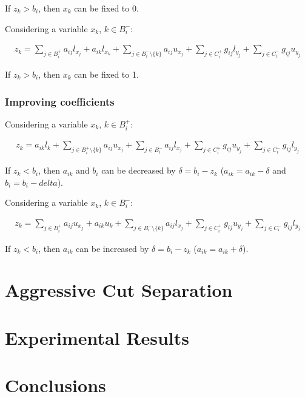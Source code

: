 \documentclass[preprint,12pt]{elsarticle}
\begin{document}
If $z_k > b_i$, then $x_k$ can be fixed to 0.

Considering a variable $x_k$, $k \in B_i^{-}$:

\begin{align}
	z_k = \sum_{j \in B_i^+}{a_{ij}l_{x_j}} + a_{ik}l_{x_k} + \sum_{j \in B_i^-\setminus\{k\}}{a_{ij}u_{x_j}} + \sum_{j \in C_i^+}{g_{ij}l_{y_j}} + \sum_{j \in C_i^-}{g_{ij}u_{y_j}}
\end{align}

If $z_k > b_i$, then $x_k$ can be fixed to 1.

\subsubsection{Improving coefficients}

Considering a variable $x_k$, $k \in B_i^{+}$:

\begin{align}
	z_k = a_{ik}l_k + \sum_{j \in B_i^+\setminus\{k\}}{a_{ij}u_{x_j}} + \sum_{j \in B_i^-}{a_{ij}l_{x_j}} + \sum_{j \in C_i^+}{g_{ij}u_{y_j}} + \sum_{j \in C_i^-}{g_{ij}l_{y_j}}
\end{align}

If $z_k < b_i$, then $a_{ik}$ and $b_i$ can be decreased by $\delta = b_i - z_k$ ($a_{ik} = a_{ik} - \delta$ and $b_i = b_i - delta$).

Considering a variable $x_k$, $k \in B_i^{-}$:

\begin{align}
	z_k = \sum_{j \in B_i^+}{a_{ij}u_{x_j}} + a_{ik}u_k + \sum_{j \in B_i^-\setminus\{k\}}{a_{ij}l_{x_j}} + \sum_{j \in C_i^+}{g_{ij}u_{y_j}} + \sum_{j \in C_i^-}{g_{ij}l_{y_j}}
\end{align}

If $z_k < b_i$, then $a_{ik}$ can be increased by $\delta = b_i - z_k$ ($a_{ik} = a_{ik} + \delta$).

\section{Aggressive Cut Separation}\label{cuts}

\section{Experimental Results}\label{experiments}

\section{Conclusions}\label{conclusions}
\end{document}
